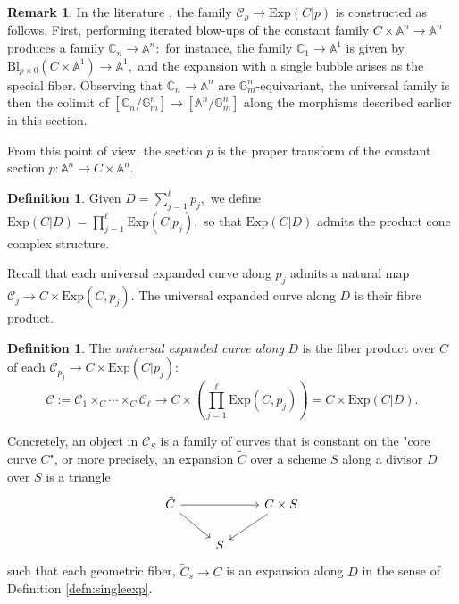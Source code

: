 \documentclass[10.5pt]{amsart}
\theoremstyle{definition}
\theoremstyle{definition}
\theoremstyle{definition}
\theoremstyle{definition}
\newtheorem{remark}[theorem]{Remark}
\newtheorem{definition}[theorem]{Definition}
\newcommand{\ra}{\rightarrow}
\begin{document}
\begin{remark}
    In the literature \cite[§1.1]{Li2001} \cite[§1.4]{MT16}, the family $\mathscr{C}_p\to \mathrm{Exp}(C|p)$ is constructed as follows. {First, performing iterated blow-ups of the constant family $C\times \mathbb{A}^n\to \mathbb{A}^n$ produces a family $\mathbb{C}_n\to \mathbb{A}^n:$ for instance, the family $\mathbb{C}_1\to \mathbb{A}^1$ is given by $\mathrm{Bl}_{p\times 0}(C\times \mathbb{A}^1)\to \mathbb{A}^1,$ and the expansion with a single bubble arises as the special fiber. Observing that $\mathbb{C}_n\to \mathbb{A}^n$ are $\mathbb{G}_m^n$-equivariant, the universal family is then the colimit of $[\mathbb{C}_n/\mathbb{G}_m^n]\to [\mathbb{A}^n/\mathbb{G}_m^n]$ along the morphisms described earlier in this section.}

    From this point of view, the section $\tilde{p}$ is the proper transform of the constant section $p: \mathbb{A}^n\to C\times \mathbb{A}^n.$
\end{remark}


\begin{definition}
  Given $D = \sum_{j=1}^\ell p_j,$ we define $\mathrm{Exp}(C|D) = \prod_{j=1}^{\ell} \mathrm{Exp}(C|p_j),$ so that $\mathrm{Exp}(C|D)$ admits the product cone complex structure.
\end{definition}


 Recall that each universal expanded curve along $p_j$ admits a natural map $\mathscr{C}_j\to C\times \mathrm{Exp}(C,p_j).$ The universal expanded curve along $D$ is their fibre product.

 \begin{definition}
  The \emph{universal expanded curve along} $D$ is the fiber product  over $C$ of each $\mathscr{C}_{p_j}\to C\times \mathrm{Exp}(C|p_j)$: \[\mathscr{C}:= \mathscr{C}_1\times_C \cdots\times_C \mathscr{C}_\ell\to C\times \left(\prod_{j=1}^\ell \mathrm{Exp}(C,p_j)\right) = C\times \mathrm{Exp}(C|D).\]
 \end{definition}

Concretely, an object in $\mathscr{C}_S$ is a family of curves that is constant on the "core curve $C$", or more precisely, an expansion $\tilde C$ over a scheme $S$ along a divisor $D$ over $S$ is a triangle \[\begin{tikzcd}
	{\tilde{C}} && {{C \times S}} \\
	& S
	\arrow[from=1-1, to=1-3]
	\arrow[from=1-1, to=2-2]
	\arrow[from=1-3, to=2-2]
\end{tikzcd}\] such that each geometric fiber, $\tilde C_s \ra C$ is an expansion along $D$ in the sense of Definition \ref{defn:singleexp}. 
\end{document}
